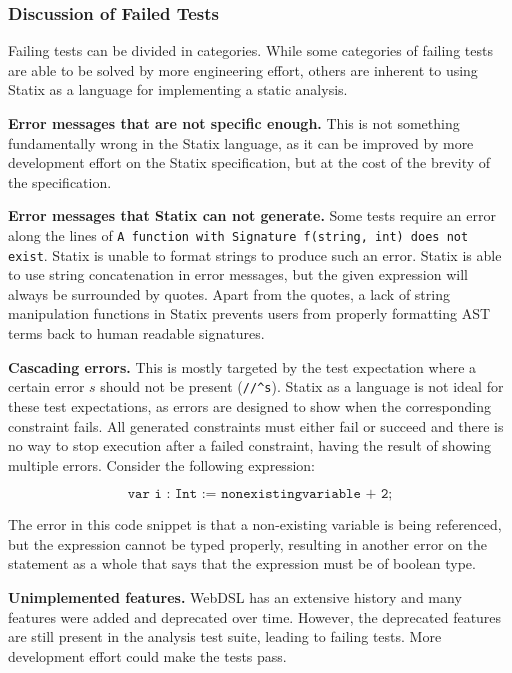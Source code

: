     \subsubsection{Discussion of Failed Tests}

      Failing tests can be divided in categories. While some categories of failing tests are able to be solved by more engineering effort, others are inherent to using Statix as a language for implementing a static analysis.

      \textbf{Error messages that are not specific enough.} This is not something fundamentally wrong in the Statix language, as it can be improved by more development effort on the Statix specification, but at the cost of the brevity of the specification.

      \textbf{Error messages that Statix can not generate.} Some tests require an error along the lines of \texttt{A function with Signature f(string, int) does not exist}. Statix is unable to format strings to produce such an error. Statix is able to use string concatenation in error messages, but the given expression will always be surrounded by quotes. Apart from the quotes, a lack of string manipulation functions in Statix prevents users from properly formatting AST terms back to human readable signatures.

      \textbf{Cascading errors.} This is mostly targeted by the test expectation where a certain error $s$ should not be present (\texttt{//\^{}s}). Statix as a language is not ideal for these test expectations, as errors are designed to show when the corresponding constraint fails. All generated constraints must either fail or succeed and there is no way to stop execution after a failed constraint, having the result of showing multiple errors. Consider the following expression:
      
      $$\texttt{var i : Int := nonexistingvariable + 2;}$$
      
      The error in this code snippet is that a non-existing variable is being referenced, but the expression cannot be typed properly, resulting in another error on the statement as a whole that says that the expression must be of boolean type.
      
      \textbf{Unimplemented features.} WebDSL has an extensive history and many features were added and deprecated over time. However, the deprecated features are still present in the analysis test suite, leading to failing tests. More development effort could make the tests pass.

